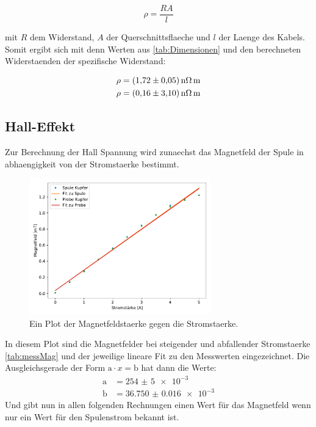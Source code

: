     \begin{equation}
        \rho = \frac{RA}{l}
    \end{equation}

    mit $R$ dem Widerstand, $A$ der Querschnittsflaeche und $l$ der Laenge des Kabels.
    Somit ergibt sich mit denn Werten aus \ref{tab:Dimensionen} und den berechneten Widerstaenden der spezifische Widerstand:

    \begin{align}
        \rho &= \SI{1.72+-0.05}{\nano\ohm\meter}\\
        \rho &= \SI{0.16+-03.1}{\nano\ohm\meter}
    \end{align}

    \subsection{Hall-Effekt}
    Zur Berechnung der Hall Spannung wird zunaechst das Magnetfeld der Spule in abhaengigkeit von der Stromstaerke bestimmt.

    \begin{figure}[H]
        \centering
        \includegraphics[width=0.7\textwidth]{build/Magnetfeld.pdf}
        \caption{Ein Plot der Magnetfeldstaerke gegen die Stromstaerke.}
        \label{img:Magnetfeld}
    \end{figure}

    In diesem Plot sind die Magnetfelder bei steigender und abfallender Stromstaerke \ref{tab:messMag} und der jeweilige lineare Fit zu den 
    Messwerten eingezeichnet.
    Die Ausgleichsgerade der Form $\text{a}\cdot x = \text{b}$ hat dann die Werte:
    \begin{align}
        \text{a} & = \num{254(5)e-3}\\
        \text{b} & = \num{36.750(16)e-3}
    \end{align}
    Und gibt nun in allen folgenden Rechnungen einen Wert für das Magnetfeld wenn nur ein Wert für den Spulenstrom bekannt ist.

